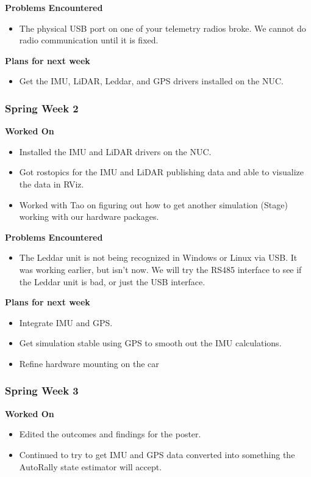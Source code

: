 \documentclass[compsoc,draftclsnofoot,onecolumn,10pt]{IEEEtran}
\begin{document}
\textbf{Problems Encountered}
\begin{itemize}
    \item The physical USB port on one of your telemetry radios broke. We cannot do radio communication until it is fixed.
\end{itemize}

\textbf{Plans for next week}
\begin{itemize}
    \item Get the IMU, LiDAR, Leddar, and GPS drivers installed on the NUC.
\end{itemize}


\subsubsection*{Spring Week 2}
\textbf{Worked On}
\begin{itemize}
    \item Installed the IMU and LiDAR drivers on the NUC.
    \item Got rostopics for the IMU and LiDAR publishing data and able to visualize the data in RViz.
    \item Worked with Tao on figuring out how to get another simulation (Stage) working with our hardware packages.
\end{itemize}

\textbf{Problems Encountered}
\begin{itemize}
    \item The Leddar unit is not being recognized in Windows or Linux via USB. It was working earlier, but isn't now. We will try the RS485 interface to see if the Leddar unit is bad, or just the USB interface.
\end{itemize}

\textbf{Plans for next week}
\begin{itemize}
    \item Integrate IMU and GPS.
    \item Get simulation stable using GPS to smooth out the IMU calculations.
    \item Refine hardware mounting on the car
\end{itemize}

\subsubsection*{Spring Week 3}

\textbf{Worked On}
\begin{itemize}
    \item Edited the outcomes and findings for the poster.
    \item Continued to try to get IMU and GPS data converted into something the AutoRally state estimator will accept.
\end{itemize}
\end{document}
